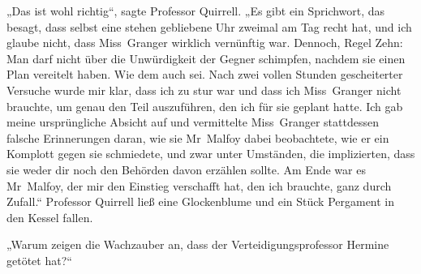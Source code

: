 „Das ist wohl richtig“, sagte Professor Quirrell. „Es gibt ein Sprichwort, das besagt, dass selbst eine stehen gebliebene Uhr zweimal am Tag recht hat, und ich glaube nicht, dass Miss~Granger wirklich vernünftig war. Dennoch, Regel Zehn: Man darf nicht über die Unwürdigkeit der Gegner schimpfen, nachdem sie einen Plan vereitelt haben. Wie dem auch sei. Nach zwei vollen Stunden gescheiterter Versuche wurde mir klar, dass ich zu stur war und dass ich Miss~Granger nicht brauchte, um genau den Teil auszuführen, den ich für sie geplant hatte. Ich gab meine ursprüngliche Absicht auf und vermittelte Miss~Granger stattdessen falsche Erinnerungen daran, wie sie Mr~Malfoy dabei beobachtete, wie er ein Komplott gegen sie schmiedete, und zwar unter Umständen, die implizierten, dass sie weder dir noch den Behörden davon erzählen sollte. Am Ende war es Mr~Malfoy, der mir den Einstieg verschafft hat, den ich brauchte, ganz durch Zufall.“
Professor Quirrell ließ eine Glockenblume und ein Stück Pergament in den Kessel fallen.

„Warum zeigen die Wachzauber an, dass der Verteidigungsprofessor Hermine getötet hat?“

